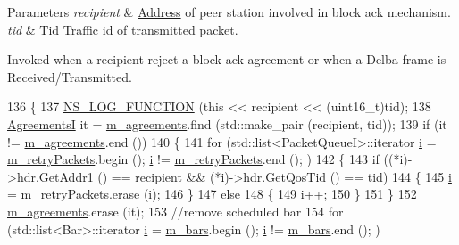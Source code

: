 \begin{DoxyParams}{Parameters}
{\em recipient} & \hyperlink{classns3_1_1Address}{Address} of peer station involved in block ack mechanism. \\
\hline
{\em tid} & Tid Traffic id of transmitted packet.\\
\hline
\end{DoxyParams}
Invoked when a recipient reject a block ack agreement or when a Delba frame is Received/\+Transmitted. 
\begin{DoxyCode}
136 \{
137   \hyperlink{log-macros-disabled_8h_a90b90d5bad1f39cb1b64923ea94c0761}{NS\_LOG\_FUNCTION} (\textcolor{keyword}{this} << recipient << (uint16\_t)tid);
138   \hyperlink{classns3_1_1BlockAckManager_acbd1cf7c5f3487150955c3a4c9d04102}{AgreementsI} it = \hyperlink{classns3_1_1BlockAckManager_a952a6b8b29705c83ba6464f7cf7ffe66}{m\_agreements}.find (std::make\_pair (recipient, tid));
139   \textcolor{keywordflow}{if} (it != \hyperlink{classns3_1_1BlockAckManager_a952a6b8b29705c83ba6464f7cf7ffe66}{m\_agreements}.end ())
140     \{
141       \textcolor{keywordflow}{for} (std::list<PacketQueueI>::iterator \hyperlink{bernuolliDistribution_8m_a6f6ccfcf58b31cb6412107d9d5281426}{i} = \hyperlink{classns3_1_1BlockAckManager_a2851f947dd68945ebc25961cff893ed9}{m\_retryPackets}.begin (); 
      \hyperlink{bernuolliDistribution_8m_a6f6ccfcf58b31cb6412107d9d5281426}{i} != \hyperlink{classns3_1_1BlockAckManager_a2851f947dd68945ebc25961cff893ed9}{m\_retryPackets}.end (); )
142         \{
143           \textcolor{keywordflow}{if} ((*i)->hdr.GetAddr1 () == recipient && (*i)->hdr.GetQosTid () == tid)
144             \{
145               \hyperlink{bernuolliDistribution_8m_a6f6ccfcf58b31cb6412107d9d5281426}{i} = \hyperlink{classns3_1_1BlockAckManager_a2851f947dd68945ebc25961cff893ed9}{m\_retryPackets}.erase (\hyperlink{bernuolliDistribution_8m_a6f6ccfcf58b31cb6412107d9d5281426}{i});
146             \}
147           \textcolor{keywordflow}{else}
148             \{
149               \hyperlink{bernuolliDistribution_8m_a6f6ccfcf58b31cb6412107d9d5281426}{i}++;
150             \}
151         \}
152       \hyperlink{classns3_1_1BlockAckManager_a952a6b8b29705c83ba6464f7cf7ffe66}{m\_agreements}.erase (it);
153       \textcolor{comment}{//remove scheduled bar}
154       \textcolor{keywordflow}{for} (std::list<Bar>::iterator \hyperlink{bernuolliDistribution_8m_a6f6ccfcf58b31cb6412107d9d5281426}{i} = \hyperlink{classns3_1_1BlockAckManager_af2339008509896569fe53c035f27c9b4}{m\_bars}.begin (); \hyperlink{bernuolliDistribution_8m_a6f6ccfcf58b31cb6412107d9d5281426}{i} != \hyperlink{classns3_1_1BlockAckManager_af2339008509896569fe53c035f27c9b4}{m\_bars}.end (); )

\end{DoxyCode}
